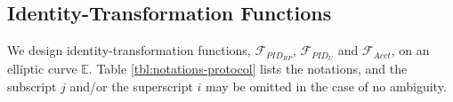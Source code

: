 

\subsection{Identity-Transformation Functions}
\label{subsec:overview}

We design identity-transformation functions,
     $\mathcal{F}_{PID_{RP}}$, $\mathcal{F}_{PID_{U}}$ and $\mathcal{F}_{Acct}$,
    on an elliptic curve $\mathbb{E}$.
Table \ref{tbl:notations-protocol} lists the notations,
    and the subscript $j$ and/or the superscript $i$ may be omitted in the case of no ambiguity.



